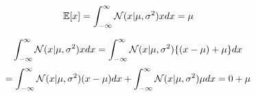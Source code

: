 $$\mathbb{E}[x]=\int_{-\infty}^{\infty}{{\cal N}(x|\mu, \sigma^{2})xdx}=\mu$$


$$
\int_{-\infty}^{\infty}{{\cal N}(x|\mu, \sigma^{2})xdx}
=\int_{-\infty}^{\infty}{{\cal N}(x|\mu, \sigma^{2})\{(x-\mu)+\mu\}dx}
$$
$$
=\int_{-\infty}^{\infty}{{\cal N}(x|\mu, \sigma^{2})(x-\mu)dx}+\int_{-\infty}^{\infty}{{\cal N}(x|\mu, \sigma^{2})\mu dx}=0+\mu
$$
